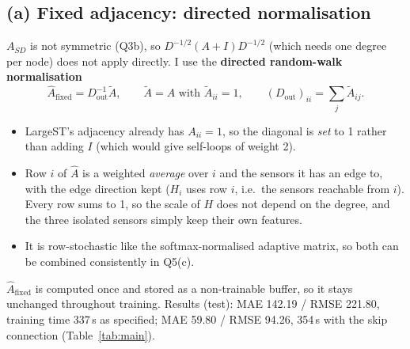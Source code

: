 \subsection*{(a) Fixed adjacency: directed normalisation}
$A_{SD}$ is not symmetric (Q3b), so $D^{-1/2}(A{+}I)D^{-1/2}$ (which needs one degree per node) does not apply directly. I use the
\textbf{directed random-walk normalisation}
\[
\hat A_{\text{fixed}}=D_{\text{out}}^{-1}\tilde A,\qquad \tilde A=A \text{ with } \tilde A_{ii}=1,\qquad
(D_{\text{out}})_{ii}=\textstyle\sum_j\tilde A_{ij}.
\]
\begin{itemize}
\item LargeST's adjacency already has $A_{ii}=1$, so the diagonal is \emph{set} to 1 rather than adding $I$ (which would give
self-loops of weight 2).
\item Row $i$ of $\hat A$ is a weighted \emph{average} over $i$ and the sensors it has an edge to, with the edge direction kept
($H_i$ uses row $i$, i.e.\ the sensors reachable from $i$). Every row sums to 1, so the scale of $H$ does not depend on the degree, and
the three isolated sensors simply keep their own features.
\item It is row-stochastic like the softmax-normalised adaptive matrix, so both can be combined consistently in Q5(c).
\end{itemize}
$\hat A_{\text{fixed}}$ is computed once and stored as a non-trainable buffer, so it stays unchanged throughout training.
Results (test): MAE 142.19 / RMSE 221.80, training time 337\,s as specified; MAE 59.80 / RMSE 94.26, 354\,s with the skip
connection (Table~\ref{tab:main}).

